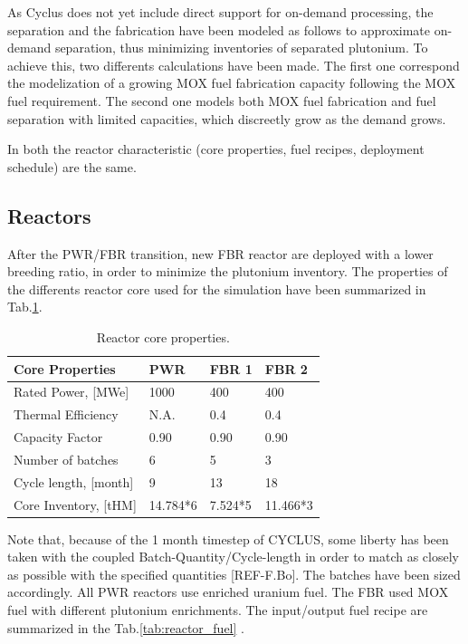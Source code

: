 \documentclass[12pt]{article}
\begin{document}
As Cyclus does not yet include direct support for on-demand processing, the separation and the fabrication have been modeled as follows to approximate on-demand separation, thus minimizing inventories of separated plutonium.
To achieve this, two differents calculations have been made. The first one correspond the modelization of a growing MOX fuel fabrication capacity following the MOX fuel requirement. The second one models both MOX fuel fabrication and fuel separation with limited capacities, which discreetly grow as the demand grows.

In both the reactor characteristic (core properties, fuel recipes, deployment schedule) are the same. 
\subsection{Reactors}
After the PWR/FBR transition, new FBR reactor are deployed with a lower breeding ratio, in order to minimize the plutonium inventory. The properties of the differents reactor core used for the simulation have been summarized in Tab.\ref{tab:reactor}.\\


\begin{table}[h!]
\centering
\begin{tabular}{llll}
\hline
Core Properties		&	PWR 	&	FBR 1	&	FBR 2 	\\ 
\hline 
Rated Power, [MWe]	&	1000		&	400		&	400		\\ 
Thermal Efficiency	&	N.A.		&	0.4		&	0.4		\\ 
Capacity Factor		&	0.90		&	0.90		&	0.90		\\ 
Number of batches	&	6		&	5		&	3		\\ 
Cycle length, [month]&	9		&	13		&	18		\\ 
Core Inventory, [tHM]&	14.784*6	&	7.524*5	&	11.466*3	\\ 
\hline
\end{tabular}
\caption{Reactor core properties.}
\label{tab:reactor}
\end{table}
Note that, because of the 1 month timestep of CYCLUS, some liberty has been taken with the coupled Batch-Quantity/Cycle-length in order to match as closely as possible with the specified quantities [REF-F.Bo]. The batches have been sized accordingly. All PWR reactors use enriched uranium fuel. The FBR used MOX fuel with different plutonium enrichments. The input/output fuel recipe are summarized in the Tab.\ref{tab:reactor_fuel} \cite{B.Feng_calculation}.
\end{document}
